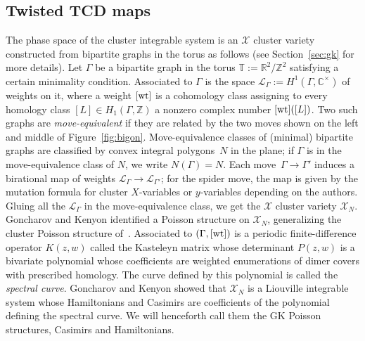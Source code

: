 \documentclass[pdftex]{sigma}
\numberwithin{equation}{section}
\newcommand{\Z}{{\mathbb Z}}
\newcommand{\R}{{\mathbb R}}
\newcommand{\C}{{\mathbb C}}
\newcommand{\T}{{\mathbb T}}
\newcommand{\ra}{\rightarrow}
\newcommand{\wt}{{\rm wt}}
\begin{document}
	\subsection{Twisted TCD maps}
	
	The phase space of the cluster integrable system is an $\mathcal X$ cluster variety constructed from bipartite graphs in the torus as follows (see Section~\ref{sec:gk} for more details).
	Let $\Gamma$ be a bipartite graph in the torus $\T:= \R^2/\Z^2$ satisfying a certain minimality condition. Associated to $\Gamma$ is the space $\mathcal L_\Gamma:=H^1(\Gamma,\C^\times)$ of weights on it, where a weight $[\wt]$ is a cohomology class assigning to every homology class $[L] \in H_1(\Gamma,\Z)$ a nonzero complex number $[\wt]([L])$. Two such graphs are \textit{move-equivalent} if they are related by the two moves shown on the left and middle of Figure~\ref{fig:bigon}. Move-equivalence classes of (minimal) bipartite graphs are classified by convex integral polygons~$N$ in the plane; if $\Gamma$ is in the move-equivalence class of $N$, we write $N(\Gamma)=N$. Each move~${\Gamma \ra \Gamma'}$ induces a birational map of weights $\mathcal L_\Gamma \rightarrow \mathcal L_{\Gamma'}$; for the spider move, the map is given by the mutation formula for cluster $X$-variables \cite{FG} or $y$-variables \cite{FZ} depending on the authors. Gluing all the $\mathcal L_\Gamma$ in the move-equivalence class, we get the $\mathcal X$ cluster variety $\mathcal X_N$. Goncharov and Kenyon identified a Poisson structure on $\mathcal X_N$, generalizing the cluster Poisson structure of~\cite{GSTV}. Associated to $(\Gamma,[\wt])$ is a periodic finite-difference operator $K(z,w)$ called the Kasteleyn matrix whose determinant $P(z,w)$ is a bivariate polynomial whose coefficients are weighted enumerations of dimer covers with prescribed homology. The curve defined by this polynomial is called the \textit{spectral curve}. Goncharov and Kenyon showed that $\mathcal X_N$ is a Liouville integrable system whose Hamiltonians and Casimirs are coefficients of the polynomial defining the spectral curve. We will henceforth call them the GK Poisson structures, Casimirs and Hamiltonians.
	
\end{document}
